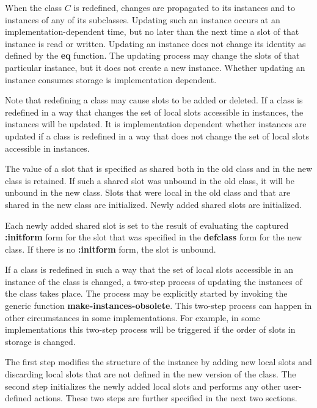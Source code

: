 
When the class $C$ is redefined, changes are propagated to its instances
and to instances of any of its subclasses.  Updating such an
instance occurs at an implementation-dependent time, but no later than
the next time a slot of that instance is read or written.  Updating an
instance does not change its identity as defined by the {\bf eq}
function.  The updating process may change the slots of that
particular instance, but it does not create a new instance.  Whether
updating an instance consumes storage is implementation dependent.

Note that redefining a class may cause slots to be added or deleted.
If a class is redefined in a way that changes the set of local slots
accessible in instances, the instances will be updated.  It is
implementation dependent whether instances are updated if a class is
redefined in a way that does not change the set of local slots
accessible in instances.

The value of a slot that is specified as shared both in the old class
and in the new class is retained.  If such a shared slot was unbound
in the old class, it will be unbound in the new class.  Slots that
were local in the old class and that are shared in the new class are
initialized.  Newly added shared slots are initialized.

Each newly added shared slot is set to the result of evaluating the
captured {\bf :initform} form for the slot that was specified in the
{\bf defclass} form for the new class. If there is no {\bf :initform}
form, the slot is unbound.

If a class is redefined in such a way that the set of local slots
accessible in an instance of the class is changed, a two-step process
of updating the instances of the class takes place.  The process may
be explicitly started by invoking the generic function {\bf
make-instances-obsolete}.  This two-step process can happen in other
circumstances in some implementations.  For example, in some
implementations this two-step process will be triggered if the order
of slots in storage is changed.

The first step modifies the structure of the instance by adding new
local slots and discarding local slots that are not defined in the new
version of the class.
The second step initializes the newly added local slots and performs
any other user-defined actions. These two steps are further specified
in the next two sections.

